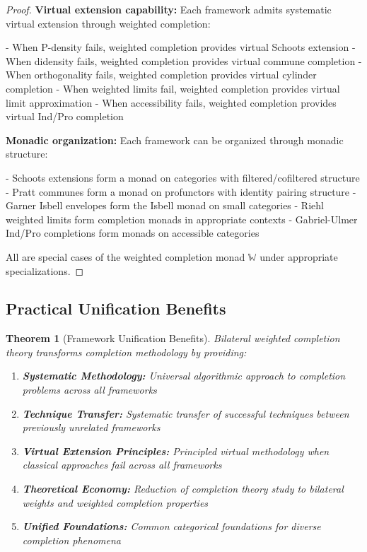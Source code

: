 \documentclass[11pt]{article}
\theoremstyle{plain}
\newtheorem{theorem}{Theorem}[section]
\theoremstyle{definition}
\theoremstyle{remark}
\begin{document}
\begin{proof}
\textbf{Virtual extension capability:} Each framework admits systematic virtual extension through weighted completion:

- When P-density fails, weighted completion provides virtual Schoots extension
- When didensity fails, weighted completion provides virtual commune completion
- When orthogonality fails, weighted completion provides virtual cylinder completion
- When weighted limits fail, weighted completion provides virtual limit approximation
- When accessibility fails, weighted completion provides virtual Ind/Pro completion

\textbf{Monadic organization:} Each framework can be organized through monadic structure:

- Schoots extensions form a monad on categories with filtered/cofiltered structure
- Pratt communes form a monad on profunctors with identity pairing structure
- Garner Isbell envelopes form the Isbell monad on small categories
- Riehl weighted limits form completion monads in appropriate contexts
- Gabriel-Ulmer Ind/Pro completions form monads on accessible categories

All are special cases of the weighted completion monad $\mathbb{W}$ under appropriate specializations.
\end{proof}

\subsection{Practical Unification Benefits}

\begin{theorem}[Framework Unification Benefits]\label{thm:unification-benefits}
Bilateral weighted completion theory transforms completion methodology by providing:

\begin{enumerate}
\item \textbf{Systematic Methodology:} Universal algorithmic approach to completion problems across all frameworks

\item \textbf{Technique Transfer:} Systematic transfer of successful techniques between previously unrelated frameworks

\item \textbf{Virtual Extension Principles:} Principled virtual methodology when classical approaches fail across all frameworks

\item \textbf{Theoretical Economy:} Reduction of completion theory study to bilateral weights and weighted completion properties

\item \textbf{Unified Foundations:} Common categorical foundations for diverse completion phenomena
\end{enumerate}
\end{theorem}
\end{document}
